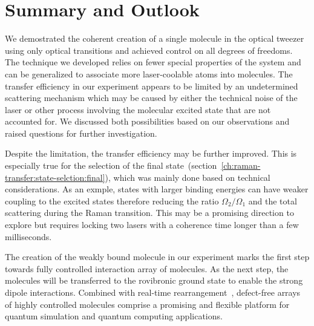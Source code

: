 
\section{Summary and Outlook}
\label{ch:raman-transfer:summary}

We demostrated the coherent creation of a single molecule in the optical tweezer
using only optical transitions and achieved control on all degrees of freedoms.
The technique we developed relies on fewer special properties of the system
and can be generalized to associate more laser-coolable atoms into molecules.
The transfer efficiency in our experiment appears to be limited
by an undetermined scattering mechanism which may be caused by
either the technical noise of the laser
or other process involving the molecular excited state that are not accounted for.
We discussed both possibilities based on our observations
and raised questions for further investigation.

Despite the limitation, the transfer efficiency may be further improved.
This is especially true for the selection
of the final state~(section~\ref{ch:raman-transfer:state-selction:final}),
which was mainly done based on technical considerations.
As an exmple, states with larger binding energies can have weaker coupling
to the excited states therefore reducing the ratio $\Omega_2/\Omega_1$
and the total scattering during the Raman transition.
This may be a promising direction to explore
but requires locking two lasers with a coherence time longer than a few milliseconds.

The creation of the weakly bound molecule in our experiment marks
the first step towards fully controlled interaction array of molecules.
As the next step, the molecules will be transferred to the rovibronic ground state
to enable the strong dipole interactions.
Combined with real-time rearrangement~\cite{barredo_atom-by-atom_2016,endres_atom-by-atom_2016},
defect-free arrays of highly controlled molecules comprise a promising
and flexible platform for quantum simulation and quantum computing applications.
